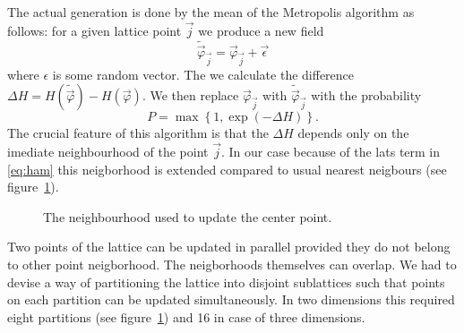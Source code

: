 \documentclass[a4paper]{llncs}
\newcommand{\vphi}{\vec{\varphi}}
\newcommand{\vj}{{\vec{j}}}
\begin{document}
The actual  generation is done by the mean of the Metropolis  algorithm as follows: for a given lattice point $\vj$ we produce a new field 
\begin{equation}
\widetilde{\vphi}_\vj=\vphi_\vj+\vec{\epsilon}
\end{equation}
where $\epsilon$ is some random vector. The we calculate the difference 
$\Delta H = H(\widetilde{\vphi})-H(\vphi)$.
We then replace $\vphi_\vj$ with $\widetilde{\vphi}_\vj$ with the probability
\begin{equation}
P=\max\left\{1,\exp(-\Delta H)\right\}.
\end{equation}
The crucial feature of this algorithm is that the $\Delta H$ depends
only on the imediate neighbourhood of the point $\vj$. In our case
because of the lats term in \eqref{eq:ham} this neigborhood is
extended compared to usual nearest neigbours (see figure~\ref{fig:nn}). 
\begin{figure}
\begin{center} 
\end{center}
\caption{\label{fig:nn}The neighbourhood used to update the center point.}
\end{figure}

Two points of the lattice can be updated in parallel provided they do
not belong to other point neigborhood. The neigborhoods themselves can
overlap. We had to devise a way of partitioning the lattice into disjoint sublattices such that points on each partition can be updated simultaneously. In two dimensions this required eight partitions (see figure~\ref{fig:nn})  and 16 in case of three dimensions. 
\end{document}
